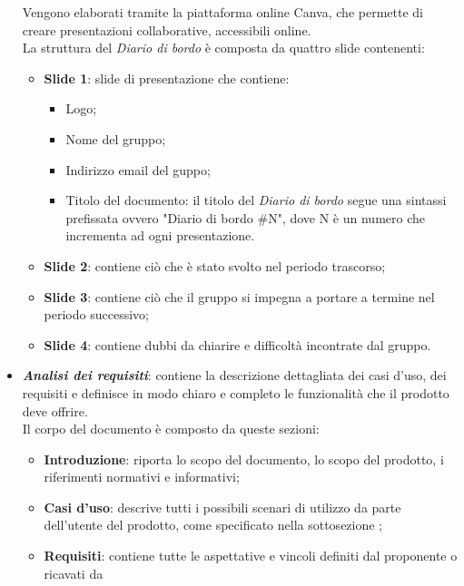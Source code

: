 \begin{itemize}
            Vengono elaborati tramite la piattaforma online Canva, che permette di creare presentazioni collaborative, accessibili online.\\
            La struttura del \textit{Diario di bordo} è composta da quattro slide contenenti:
            \begin{itemize}
                  \item \textbf{Slide 1}: slide di presentazione che contiene:
                        \begin{itemize}
                              \item Logo;
                              \item Nome del gruppo;
                              \item Indirizzo email del guppo;
                              \item Titolo del documento: il titolo del \textit{Diario di bordo} segue una sintassi
                                    prefissata ovvero "Diario di bordo \#N", dove N è un numero che incrementa ad
                                    ogni presentazione.
                        \end{itemize}
                  \item \textbf{Slide 2}: contiene ciò che è stato svolto nel periodo trascorso;
                  \item \textbf{Slide 3}: contiene ciò che il gruppo si impegna a portare a termine nel periodo successivo;
                  \item \textbf{Slide 4}: contiene dubbi da chiarire e difficoltà incontrate dal gruppo.
            \end{itemize}
      \item \textit{\textbf{Analisi dei requisiti}}: contiene la descrizione dettagliata dei casi d'uso, dei
            requisiti e definisce in modo chiaro e completo le funzionalità che il prodotto deve offrire.
            \\Il corpo del documento è composto da queste sezioni:
            \begin{itemize}
                  \item \textbf{Introduzione}: riporta lo scopo del documento, lo scopo del prodotto, i riferimenti normativi e informativi;
                  \item \textbf{Casi d'uso}: descrive tutti i possibili scenari di utilizzo da parte dell'utente del prodotto,
                        come specificato nella sottosezione ;
                  \item \textbf{Requisiti}: contiene tutte le aspettative e vincoli definiti dal proponente o ricavati da

\end{itemize}
\end{itemize}

